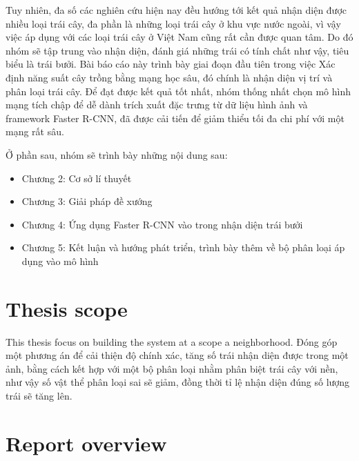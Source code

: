 Tuy nhiên, đa số các nghiên cứu hiện nay đều hướng tới kết quả nhận diện được nhiều loại trái cây, đa phần là những loại trái cây ở khu vực nước ngoài, vì vậy việc áp dụng với các loại trái cây ở Việt Nam cũng rất cần được quan tâm. Do đó nhóm sẽ tập trung vào nhận diện, đánh giá những trái có tính chất như vậy, tiêu biểu là trái bưởi. Bài báo cáo này trình bày giai đoạn đầu tiên trong việc Xác định năng suất cây trồng bằng mạng học sâu, đó chính là nhận diện vị trí và phân loại trái cây. Để đạt được kết quả tốt nhất, nhóm thống nhất chọn mô hình mạng tích chập để dễ dành trích xuất đặc trưng từ  dữ liệu hình ảnh và framework Faster R-CNN, đã được cải tiến để giảm thiểu tối đa chi phí với một mạng rất sâu.

Ở phần sau, nhóm sẽ trình bày những nội dung sau:
\begin{itemize}
	\item Chương 2: Cơ sở lí thuyết
	\item Chương 3: Giải pháp đề xướng
	\item Chương 4: Ứng dụng Faster R-CNN vào trong nhận diện trái bưởi
	\item Chương 5: Kết luận và hướng phát triển, trình bày thêm về bộ phân loại áp dụng vào mô hình
\end{itemize} 

\section{Thesis scope}
This thesis focus on building the system at a scope a neighborhood. 
Đóng góp một phương án để cải thiện độ chính xác, tăng số trái nhận diện được trong một ảnh, bằng cách kết hợp với một bộ phân loại nhằm phân biệt trái cây với nền, như vậy số vật thể phân loại sai sẽ giảm, đồng thời tỉ lệ nhận diện đúng số lượng trái sẽ tăng lên.

\section{Report overview}

